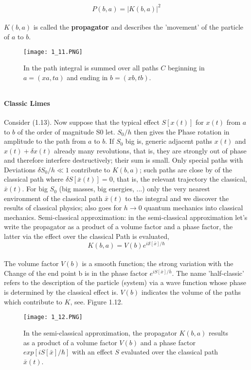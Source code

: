 \begin{equation}
P(b, a)=|K(b, a)|^{2}
\end{equation}\\
$K (b, a)$ is called the \textbf{propagator} and describes the 'movement' of the particle of
$a$ to $b$.
\begin{figure}[ht]
    \centering
    \texttt{[image: 1\_11.PNG]}
    \caption{In the path integral is summed over all paths $C$ beginning in $a = (xa, ta)$ and ending in $b = (xb, tb)$.}
    \label{fig:1.11}
\end{figure}
\\\textbf{Classic Limes}\\\\
Consider (1.13). Now suppose that the typical effect $S [x (t)]$
for $x (t)$ from $a$ to $b$ of the order of magnitude S0 let. $S_0 / h$ then gives the
Phase rotation in amplitude to the path from $a$ to $b$. If $S_0$ big
is, generic adjacent paths $x (t)$ and $x (t) + \delta x (t)$
already many revolutions, that is, they are strongly out of phase and
therefore interfere destructively; their sum is small. Only special paths with
Deviations $\delta S_0/h \ll 1$ contribute to $K (b, a)$; such paths are close by
of the classical path where $\delta S [\bar{x} (t)] = 0$, that is, the relevant trajectory
the classical, $\bar{x} (t)$. For big $S_0$ (big masses, big energies, ...)
only the very nearest environment of the classical path $\bar{x} (t)$ to the integral and we discover the results of classical physics; also goes for $h\to 0$ quantum mechanics into classical mechanics.
Semi-classical approximation: in the semi-classical approximation
let's write the propagator as a product of a volume factor and
a phase factor, the latter via the effect over the classical
Path is evaluated,
\\
\begin{equation}
K(b, a)=V(b) e^{i \mathcal{S}[\bar{x}] / \hbar}
\end{equation}\\
The volume factor $V (b)$ is a smooth function; the strong variation with the
Change of the end point b is in the phase factor $e^{iS[\bar x]/\bar{h}}$. The name
'half-classic' refers to the description of the particle (system) via
a wave function whose phase is determined by the classical effect
is. $V (b)$ indicates the volume of the paths which contribute to $K$,
see. Figure 1.12.
\begin{figure}[ht]
    \centering
    \texttt{[image: 1\_12.PNG]}
    \caption{In the semi-classical approximation, the propagator $K (b, a)$ results as a product of a volume factor $V (b)$ and a phase factor $exp [iS [\bar{x}]/\hbar]$ with an effect $S$ evaluated over the classical path $\bar{x}(t)$.}
    \label{fig:1.12}
\end{figure}
